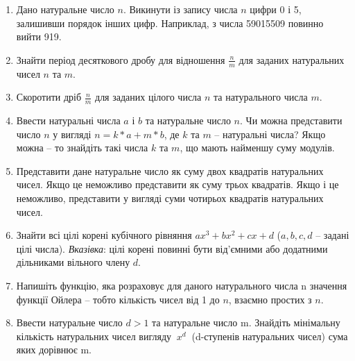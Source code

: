 \documentclass[]{article}
\makeatletter
\newcommand{\xslalph}[1]{\expandafter\@xslalph\csname c@#1\endcsname}
\newcommand{\@xslalph}[1]{%
    \ifcase#1\or а\or б\or в\or г\or д\or e\or є\or ж\or з\or i%
    \or й\or к\or л\or м\or н\or о\or п\or р\or с\or т%
    \or у\or ф\or х\or ц\or ч\or ш\or ю\or я\or аа\or бб\or вв %
    \else\@ctrerr\fi%
}
\makeatother
\begin{document}
\begin{enumerate}
\begin{enumerate}[label=\xslalph*)]
\item \(\max(\left| z_{1} \right|,\ldots,\left| z_{n} \right|),\) де
\(z_{i} = \left\{ \begin{matrix}
y_{i},\textup{ при }\left| y_{i} \right| \leq 2, \\
0.5,\textup{у інших випадках} \\
\end{matrix} \right.\ \);
\item \(\min(\left| z_{1} \right|,\ldots,\left| z_{n} \right|),\) де
\(z_{i} = \left\{ \begin{matrix}
 y_{i},\textup{ при}\ \left| y_{i} \right| \geq 1, \\
 2,\textup{у інших випадках} \\
\end{matrix} \right.\ \);
\item \(z_{1} + z_{2} + \ldots + z_{n},\) де
\(z_{i} = \left\{ \begin{matrix}
 y_{i},\textup{ при } {y}_{i} < 10, \\
 1,\textup{у інших випадках} \\
\end{matrix} \right.\ \)
 \end{enumerate}

\item

Дано натуральне число $n$. Викинути із запису числа $n$ цифри 0 і 5,
залишивши порядок інших цифр. Наприклад, з числа 59015509 повинно вийти
919.

\item
Знайти період десяткового дробу для відношення $\frac{n}{m}$ для заданих
натуральних чисел $n$ та $m$.
\item
Скоротити дріб $\frac{n}{m}$ для заданих цілого числа $n$ та натурального числа $m$.

\item
  Ввести натуральні числа $a$ і $b$ та натуральне число $n$. Чи можна
  представити число $n$ у вигляді $n= k*a + m*b$, де $k$ та $m$ -- натуральні
  числа? Якщо можна -- то знайдіть такі числа $k$ та $m$, що мають найменшу
  суму модулів.
\item
Представити дане натуральне число як суму двох квадратів натуральних
чисел. Якщо це неможливо представити як суму трьох квадратів. Якщо і це
неможливо, представити у вигляді суми чотирьох квадратів натуральних
чисел.
\item
 Знайти всі цілі корені кубічного рівняння $ax^3 + bx^2 + cx + d$ ($a,b,c,d$ 
-- задані цілі числа). \emph{Вказівка}: цілі корені повинні бути від'ємними
 або додатними дільниками вільного члену $d$.
\item
  Напишіть функцію, яка розраховує для даного натурального числа n
  значення функції Ойлера -- тобто кількість чисел від 1 до $n$, взаємно простих з
  $n$.
\item
Ввести натуральне число \(d > 1\) та натуральне число m. Знайдіть
мінімальну кількість натуральних чисел вигляду \(\ x^{d}\ \) (d-ступенів
натуральних чисел) сума яких дорівнює m.


\end{enumerate}
\end{document}
